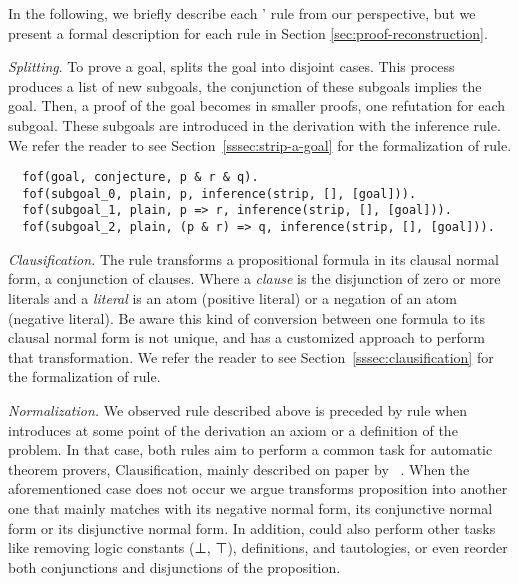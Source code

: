 In the following, we briefly describe each \Metis' rule from our perspective, but we present a formal description for each rule in Section \ref{sec:proof-reconstruction}.

\vskip 2mm


\textit{Splitting}. To prove a goal, \Metis splits the goal into
disjoint cases. This process produces a list of new subgoals, the
conjunction of these subgoals implies the goal. Then, a proof of the
goal becomes in smaller proofs, one refutation for each subgoal.
These subgoals are introduced in the \TSTP derivation with the \strip
inference rule. We refer the reader to see Section~\ref{sssec:strip-a-goal} for the formalization of \strip rule.

\begin{verbatim}
  fof(goal, conjecture, p & r & q).
  fof(subgoal_0, plain, p, inference(strip, [], [goal])).
  fof(subgoal_1, plain, p => r, inference(strip, [], [goal])).
  fof(subgoal_2, plain, (p & r) => q, inference(strip, [], [goal])).
\end{verbatim}


\textit{Clausification.} The \clausify rule transforms a
propositional formula in its clausal normal form, a conjunction
of clauses. Where a \emph{clause} is the disjunction of zero or more
literals and a \emph{literal} is an atom (positive literal) or a
negation of an atom (negative literal). Be aware this kind of conversion between one formula to its clausal normal form is not unique, and \Metis has a customized approach to perform that transformation. We refer the reader to see Section~\ref{sssec:clausification} for the formalization of \clausify rule.

\vskip 2mm


\textit{Normalization.} We observed \clausify rule described above is preceded by \canonicalize rule when \Metis introduces at some point of the derivation an axiom or a definition of the problem. In that case, both rules aim to perform a common task for
automatic theorem provers, Clausification, mainly described on paper
by \citeauthor{Sutcliffe1996}~\cite{Sutcliffe1996}. When the
aforementioned case does not occur we argue \canonicalize transforms
proposition into another one that mainly matches with its negative
normal form, its conjunctive normal form or its disjunctive normal
form. In addition, \canonicalize could also perform other tasks like
removing logic constants (⊥, ⊤), definitions, and tautologies, or even reorder both conjunctions and disjunctions of the proposition.

